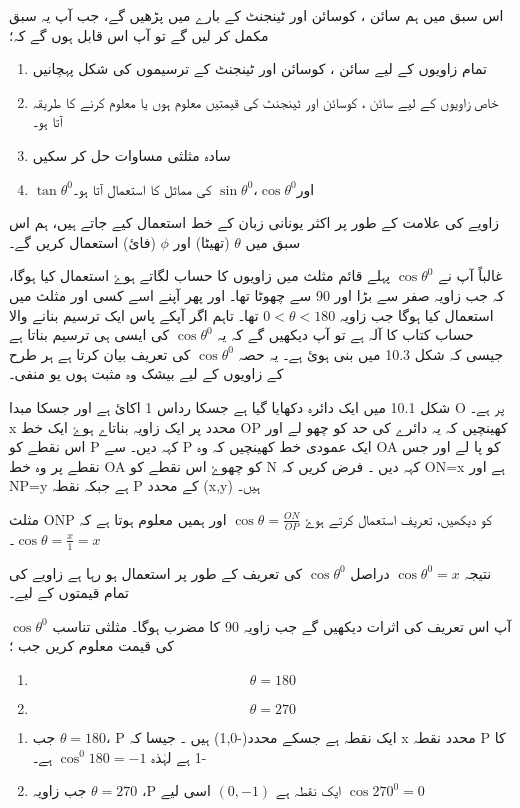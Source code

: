 

اس سبق میں ہم سائن ، کوسائن اور ٹینجنٹ کے بارے میں پڑھیں گے، جب آپ یہ سبق مکمل کر لیں گے تو آپ اس قابل ہوں گے کہ؛
\begin{enumerate}
\item
تمام زاویوں کے لیے سائن ، کوسائن اور ٹینجنٹ کے ترسیموں کی شکل پہچانیں  
\item
خاص زاویوں کے لیے سائن ، کوسائن اور ٹینجنٹ کی قیمتیں معلوم ہوں یا معلوم کرنے کا طریقہ آتا ہو۔
\item
سادہ مثلثی مساوات حل کر سکیں
\item
\(\tan{\theta}^{0}\)اور\(\cos{\theta}^{0}\)،\(\sin{\theta}^{0}\)
کی مماثل کا استعمال آتا ہو۔
\end{enumerate}


زاویے کی علامت کے طور پر اکثر یونانی زبان کے خط استعمال کیے جاتے ہیں، ہم اس سبق میں \(\theta\) (تھیٹا) اور \(\phi\) (فائ) استعمال کریں گے۔

غالباً آپ نے \(\cos{\theta}^{0}\) پہلے قائم مثلث میں زاویوں کا حساب لگاتے ہوۓ استعمال کیا ہوگا، کہ جب زاویہ صفر سے بڑا اور 90 سے چھوٹا تھا۔ اور پھر آپنے اسے کسی اور مثلث میں استعمال کیا ہوگا جب زاویہ \(0<\theta<180\) تھا۔ تاہم اگر آپکے پاس ایک ترسیم بنانے والا حساب کتاب کا آلہ ہے تو آپ دیکھیں گے کہ یہ \(\cos{\theta}^{0}\) کی ایسی ہی ترسیم بناتا ہے جیسی کہ شکل 10.3 میں بنی ہوئ ہے۔ یہ حصہ \(\cos{\theta}^{0}\) کی تعریف بیان کرتا ہے ہر طرح کے زاویوں کے لیے بیشک وہ مثبت ہوں یو منفی۔

شکل 10.1 میں ایک دائرہ دکھایا گیا ہے جسکا رداس 1 اکائ ہے اور جسکا مبدا O پر ہے۔ x محدد پر ایک زاویہ بناتاے ہوۓ ایک خط OP کھینچیں کہ یہ دائرے کی حد کو چھو لے اور اس نقطے کو P کہہ دیں۔  سے P ایک عمودی خط کھینچیں کہ وہ  OA کو پا لے اور جس نقطے پر وہ خط  OA    کو چھوۓ اس نقطے کو N کہہ دیں ۔ فرض کریں کہ  ON=x  ہے اور  NP=y   ہے 
جبکہ نقطہ   P کے محدد  (x,y) ہیں۔

مثلث ONP کو دیکھیں، تعریف استعمال کرتے ہوۓ \(\cos\theta=\frac{ON}{OP}\) اور ہمیں معلوم ہوتا ہے کہ \(\cos\theta=\frac{x}{1}=x\)۔

نتیجہ \(\cos{\theta}^{0}=x\) دراصل \(\cos{\theta}^{0}\)  کی تعریف کے طور پر استعمال ہو رہا ہے زاویے کی تمام قیمتوں کے لیے۔

آپ اس تعریف کی اثرات دیکھیں گے جب زاویہ 90 کا مضرب ہوگا۔
مثلثی تناسب \(\cos{\theta}^{0}\) کی قیمت معلوم کریں جب ؛
\begin{enumerate}
\item \[\theta=180\]
\item  \[\theta=270\]
\end{enumerate}
\begin{enumerate}
\item
  جب \(\theta=180\)، P ایک نقطہ ہے جسکے محدد(-1,0) ہیں ۔ جیسا کہ x محدد نقطہ P  کا -1 ہے لہٰذہ \(\cos^{0}180=-1\) ہے۔
\item  
جب زاویہ \(\theta=270\) ،P  ایک نقطہ ہے \((0,-1)\) اسی لیے \(\cos270^{0}=0\)
\end{enumerate}



